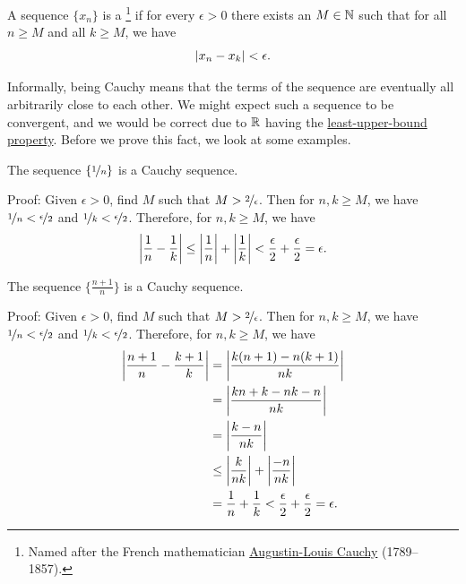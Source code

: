 \begin{defn}
A sequence $\{ x_n \}$ is a \emph{}%
\footnote{%
Named after the French mathematician
\href{https://en.wikipedia.org/wiki/Cauchy}{Augustin-Louis Cauchy} (1789--1857).} if
for every $\epsilon > 0$ there exists an $M \in {\mathbb{N}}$ such that
for all $n \geq M$ and all $k \geq M$, we have
\begin{equation*}
\left\lvert {x_n - x_k} \right\rvert < \epsilon .
\end{equation*}
\end{defn}

Informally, being Cauchy means that the terms of the sequence are eventually
all arbitrarily close to each other.  We might expect such a sequence to be
convergent, and we would be correct due to ${\mathbb{R}}$ having the
\hyperref[defn:lub]{least-upper-bound property}.  Before we prove this fact,
we look at some examples.

\begin{example}
The sequence $\{ \nicefrac{1}{n} \}$ is a Cauchy sequence.

Proof:  Given $\epsilon > 0$, find $M$ such that
$M > \nicefrac{2}{\epsilon}$.  Then for $n,k \geq M$,
we have $\nicefrac{1}{n} < \nicefrac{\epsilon}{2}$
and
$\nicefrac{1}{k} < \nicefrac{\epsilon}{2}$.  Therefore, for $n, k \geq M$,
we have
\begin{equation*}
\left\lvert {\frac{1}{n} - \frac{1}{k}} \right\rvert
\leq
\left\lvert {\frac{1}{n}} \right\rvert + \left\lvert {\frac{1}{k}} \right\rvert
< \frac{\epsilon}{2} + \frac{\epsilon}{2} = \epsilon.
\end{equation*}
\end{example}

\begin{example}
The sequence $\{ \frac{n+1}{n} \}$ is a Cauchy sequence.

Proof:  Given $\epsilon > 0$, find $M$ such that
$M > \nicefrac{2}{\epsilon}$.  Then for $n,k \geq M$,
we have $\nicefrac{1}{n} < \nicefrac{\epsilon}{2}$
and
$\nicefrac{1}{k} < \nicefrac{\epsilon}{2}$.  Therefore, for $n, k \geq M$,
we have
\begin{equation*}
\begin{split}
\left\lvert {\frac{n+1}{n} - \frac{k+1}{k}} \right\rvert
& =
\left\lvert {\frac{k(n+1)-n(k+1)}{nk}} \right\rvert
\\
& =
\left\lvert {\frac{kn+k-nk-n}{nk}} \right\rvert
\\
& =
\left\lvert {\frac{k-n}{nk}} \right\rvert
\\
& \leq
\left\lvert {\frac{k}{nk}} \right\rvert
+
\left\lvert {\frac{-n}{nk}} \right\rvert
\\
& = \frac{1}{n} + \frac{1}{k}
< \frac{\epsilon}{2} + \frac{\epsilon}{2} = \epsilon .
\end{split}
\end{equation*}
\end{example}

